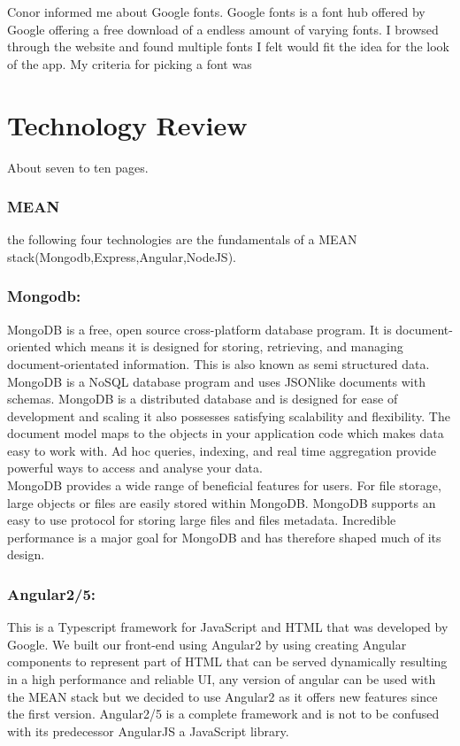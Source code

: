 Conor informed me about Google fonts. Google fonts is a font hub offered by Google offering a free download of a endless amount of varying fonts. I browsed through the website and found multiple fonts I felt would fit the idea for the look of the app. 
My criteria for picking a font was



\chapter{Technology Review}
About seven to ten pages.
\subsection{MEAN}
the following four technologies are the fundamentals of a MEAN stack(Mongodb,Express,Angular,NodeJS).

\subsection{Mongodb:}
MongoDB is a free, open source cross-platform database program. It is
document-oriented which means it is designed for storing, retrieving, and
managing document-orientated information. This is also known as semi
structured data. MongoDB is a NoSQL database program and uses JSONlike
documents with schemas. MongoDB is a distributed database and is
designed for ease of development and scaling it also possesses satisfying scalability
and flexibility. The document model maps to the objects in your application
code which makes data easy to work with. Ad hoc queries, indexing,
and real time aggregation provide powerful ways to access and analyse your
data\cite{WhatIsMo75}.
\\
MongoDB provides a wide range of beneficial features for users. For file
storage, large objects or files are easily stored within MongoDB. MongoDB
supports an easy to use protocol for storing large files and files metadata. Incredible
performance is a major goal for MongoDB and has therefore shaped
much of its design\cite{usuarist10}.

\subsection{Angular2/5:}
This is a Typescript framework for JavaScript and HTML that was developed by Google. We built our front-end using Angular2 by using creating Angular components to represent part of HTML that can be served dynamically resulting in a high performance and reliable UI, any version of angular can be used with the MEAN stack but we decided to use Angular2 as it offers new features since the first version. Angular2/5 is a complete framework and is not to be confused with its predecessor AngularJS a JavaScript library.

